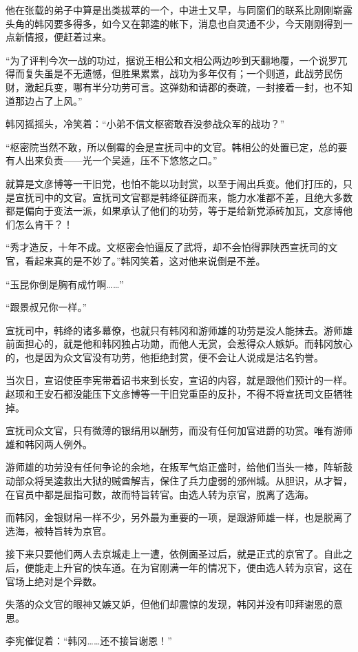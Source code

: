 他在张载的弟子中算是出类拔萃的一个，中进士又早，与同窗们的联系比刚刚崭露头角的韩冈要多得多，如今又在郭逵的帐下，消息也自灵通不少，今天刚刚得到一点新情报，便赶着过来。

“为了评判今次一战的功过，据说王相公和文相公两边吵到天翻地覆，一个说罗兀得而复失虽是不无遗憾，但胜果累累，战功为多年仅有；一个则道，此战劳民伤财，激起兵变，哪有半分功劳可言。这弹劾和请郡的奏疏，一封接着一封，也不知道那边占了上风。”

韩冈摇摇头，冷笑着：“小弟不信文枢密敢吞没参战众军的战功？”

“枢密院当然不敢，所以倒霉的会是宣抚司中的文官。韩相公的处置已定，总的要有人出来负责——光一个吴逵，压不下悠悠之口。”

就算是文彦博等一干旧党，也怕不能以功封赏，以至于闹出兵变。他们打压的，只是宣抚司中的文官。宣抚司文官都是韩绛征辟而来，能力水准都不差，且绝大多数都是偏向于变法一派，如果承认了他们的功劳，等于是给新党添砖加瓦，文彦博他们怎么肯干？！

“秀才造反，十年不成。文枢密会怕逼反了武将，却不会怕得罪陕西宣抚司的文官，看起来真的是不妙了。”韩冈笑着，这对他来说倒是不差。

“玉昆你倒是胸有成竹啊……”

“跟景叔兄你一样。”

宣抚司中，韩绛的诸多幕僚，也就只有韩冈和游师雄的功劳是没人能抹去。游师雄前面担心的，就是他和韩冈独占功勋，而他人无赏，会惹得众人嫉妒。而韩冈放心的，也是因为众文官没有功劳，他拒绝封赏，便不会让人说成是沽名钓誉。

当次日，宣诏使臣李宪带着诏书来到长安，宣诏的内容，就是跟他们预计的一样。赵顼和王安石都没能压下文彦博等一干旧党重臣的反扑，不得不将宣抚司文臣牺牲掉。

宣抚司众文官，只有微薄的银绢用以酬劳，而没有任何加官进爵的功赏。唯有游师雄和韩冈两人例外。

游师雄的功劳没有任何争论的余地，在叛军气焰正盛时，给他们当头一棒，阵斩鼓动部众将吴逵救出大狱的贼酋解吉，保住了兵力虚弱的邠州城。从胆识，从才智，在官员中都是屈指可数，故而特旨转官。由选人转为京官，脱离了选海。

而韩冈，金银财帛一样不少，另外最为重要的一项，是跟游师雄一样，也是脱离了选海，被特旨转为京官。

接下来只要他们两人去京城走上一遭，依例面圣过后，就是正式的京官了。自此之后，便能走上升官的快车道。在为官刚满一年的情况下，便由选人转为京官，这在官场上绝对是个异数。

失落的众文官的眼神又嫉又妒，但他们却震惊的发现，韩冈并没有叩拜谢恩的意思。

李宪催促着：“韩冈……还不接旨谢恩！”

